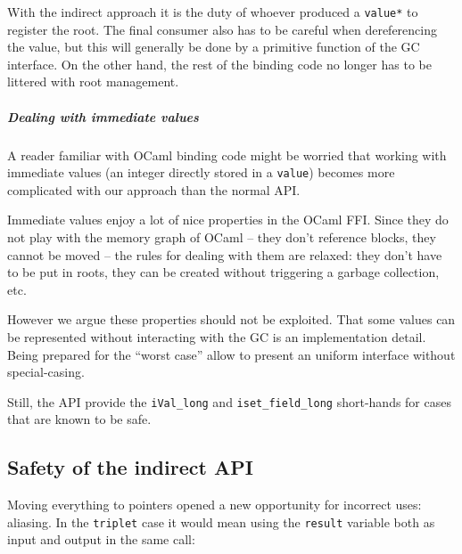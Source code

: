 \documentclass[a4paper]{easychair}
\begin{document}
With the indirect approach it is the duty of whoever produced a
\texttt{value*} to register the root. The final consumer also has to be
careful when dereferencing the value, but this will generally be done by
a primitive function of the GC interface. On the other hand, the rest of
the binding code no longer has to be littered with root management.

\hypertarget{dealing-with-immediate-values}{%
\subparagraph{Dealing with immediate
values}\label{dealing-with-immediate-values}}

A reader familiar with OCaml binding code might be worried that working
with immediate values (an integer directly stored in a \texttt{value})
becomes more complicated with our approach than the normal API.

Immediate values enjoy a lot of nice properties in the OCaml FFI. Since
they do not play with the memory graph of OCaml -- they don't reference
blocks, they cannot be moved -- the rules for dealing with them are
relaxed: they don't have to be put in roots, they can be created without
triggering a garbage collection, etc.

However we argue these properties should not be exploited. That some
values can be represented without interacting with the GC is an
implementation detail. Being prepared for the ``worst case'' allow to
present an uniform interface without special-casing.

Still, the API provide the \texttt{iVal\_long} and
\texttt{iset\_field\_long} short-hands for cases that are known to be
safe.

\hypertarget{safety-of-the-indirect-api}{%
\subsection{Safety of the indirect
API}\label{safety-of-the-indirect-api}}

Moving everything to pointers opened a new opportunity for incorrect
uses: aliasing. In the \texttt{triplet} case it would mean using the
\texttt{result} variable both as input and output in the same call:

\begin{Shaded}
\begin{Highlighting}[]
\NormalTok{\{}
\NormalTok{\}}
\end{Highlighting}
\end{Shaded}
\end{document}
